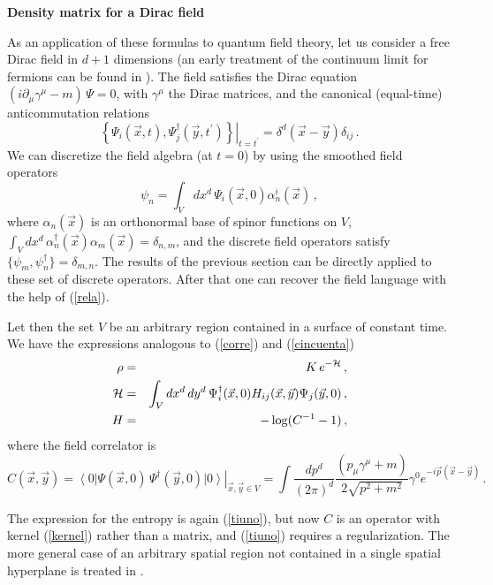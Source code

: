 \documentclass[11pt]{article}
\begin{document}
\noindent \textbf{Density matrix for a Dirac field}
 
\noindent As an application of these formulas to quantum field theory, let us consider a free Dirac field in $d+1$ dimensions (an early treatment of the continuum limit for fermions can be found in \cite{p1}). The field satisfies the Dirac equation $
(i\partial_\mu \gamma^\mu -m) \, \Psi =0$, 
 with $\gamma^\mu$ the Dirac matrices, and the 
canonical (equal-time) anticommutation relations
\begin{equation}
\left. \left\{\Psi_i(\vec{x},t),\Psi^{\dagger}_j(\vec{y},t^\prime)\right\}\right|_{t=t^\prime}=\delta^d(\vec{x}-\vec{y})\delta_{ij}\,.
\end{equation}
We can discretize the field algebra (at $t=0$) by using the smoothed field operators
\begin{equation}
\psi_{n}=\int_V dx^d\, \Psi_i(\vec{x},0) \alpha^i_n (\vec{x})\,,\label{rela}
\end{equation}  
where $\alpha_n(\vec{x})$ is an orthonormal base of spinor functions on $V$, $
\int_V dx^d\, \alpha_n^\dagger (\vec{x}) \alpha_m (\vec{x})=\delta_{n,m}$, 
and the discrete field operators satisfy $
\{\psi_m,\psi_n^\dagger\}=\delta_{m,n}$.
The results of the previous section can be directly applied to these set of discrete operators. After that one can recover the field language with the help of (\ref{rela}). 

Let then the set $V$ be an arbitrary region contained in a surface of constant time. We have the expressions analogous to (\ref{corre}) and (\ref{cincuenta}) 
\begin{eqnarray}
\rho &=& K\, e^{-{\cal H}}\,, \\
{\cal H}&=&\int_V dx^d\,dy^d \,\Psi_i^{\dagger}(\vec{x},0)H_{ij}(\vec{x},\vec{y}) \Psi_j(\vec{y},0)\,,\label{rho2}\\
H&=&-\log (C^{-1}-1 )\,,
\end{eqnarray}
where the field correlator is 
\begin{equation}
C(\vec{x},\vec{y})=\left. \left\langle0 \right|\Psi(\vec{x},0)\,\Psi^\dagger(\vec{y},0) \left|0\right\rangle \right|_{\vec{x},\vec{y}\in V}=\int \frac{dp^d}{(2\pi)^d}  \frac{(p_\mu \gamma^\mu +m)}{2 \sqrt{p^2+m^2}}\gamma^0 e^{-i \vec{p}(\vec{x}-\vec{y})}\,.
\label{kernel}
\end{equation}


The expression for the entropy is again (\ref{tiuno}), but now $C$ is an operator with kernel (\ref{kernel}) rather than a matrix, and (\ref{tiuno}) requires a regularization. 
 The more general case of an arbitrary spatial region not contained in a single spatial hyperplane is treated in \cite{futuro}.
\end{document}
